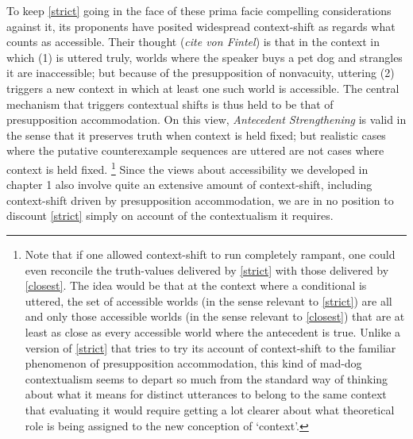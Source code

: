 \documentclass[If.tex]{subfiles}
\begin{document}
To keep \ref{strict} going in the face of these prima facie compelling considerations against it, its proponents have posited widespread context-shift as regards what counts as accessible. Their thought (\emph{cite von Fintel}) is that in the context in which (1) is uttered truly, worlds where the speaker buys a pet dog and strangles it are inaccessible; but because of the presupposition of nonvacuity, uttering (2) triggers a new context in which at least one such world is accessible. The central mechanism that triggers contextual shifts is thus held to be that of presupposition accommodation. On this view, \emph{Antecedent Strengthening} is valid in the sense that it preserves truth when context is held fixed; but realistic cases where the putative counterexample sequences are uttered are not cases where context is held fixed.%
\footnote{Note that if one allowed context-shift to run completely rampant, one could even reconcile the truth-values delivered by \ref{strict} with those delivered by \ref{closest}. The idea would be that at the context where a conditional is uttered, the set of accessible worlds (in the sense relevant to \ref{strict}) are all and only those accessible worlds (in the sense relevant to \ref{closest}) that are at least as close as every accessible world where the antecedent is true. Unlike a version of \ref{strict} that tries to try its account of context-shift to the familiar phenomenon of presupposition accommodation, this kind of mad-dog contextualism seems to depart so much from the standard way of thinking about what it means for distinct utterances to belong to the same context that evaluating it would require getting a lot clearer about what theoretical role is being assigned to the new conception of ‘context’.} 
Since the views about accessibility we developed in chapter 1 also involve quite an extensive amount of context-shift, including context-shift driven by presupposition accommodation, we are in no position to discount \ref{strict} simply on account of the contextualism it requires.%

\end{document}
